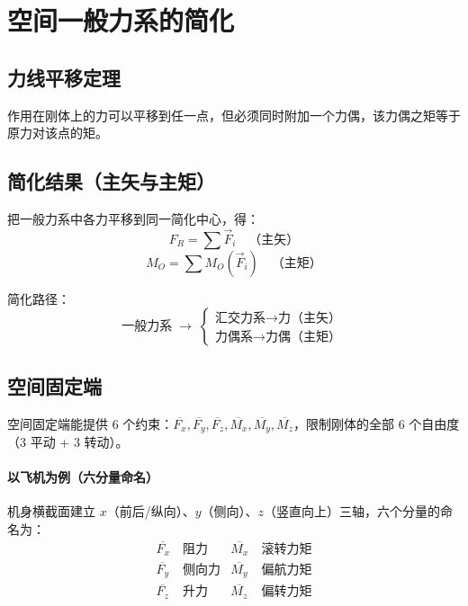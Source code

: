 \section{空间一般力系的简化}

\subsection{力线平移定理}

 作用在刚体上的力可以平移到任一点，但必须同时附加一个力偶，该力偶之矩等于原力对该点的矩。

\subsection{简化结果（主矢与主矩）}

把一般力系中各力平移到同一简化中心，得：
\begin{equation}
F_R=\sum\vec{F}_i \quad \text{（主矢）}
\label{eq:3-简化-主矢}
\end{equation}
\begin{equation}
M_O=\sum M_O(\vec{F}_i) \quad \text{（主矩）}
\label{eq:3-简化-主矩}
\end{equation}

简化路径：
\begin{equation}
\text{一般力系}\;\longrightarrow\;
\begin{cases}
\text{汇交力系}\longrightarrow\text{力（主矢）}\\
\text{力偶系}\longrightarrow\text{力偶（主矩）}
\end{cases}
\label{eq:3-简化-路径}
\end{equation}

\subsection{空间固定端}

空间固定端能提供 6 个约束：$\overline{F_x},\overline{F_y},\overline{F_z},\overline{M_x},\overline{M_y},\overline{M_z}$，限制刚体的全部 6 个自由度（3 平动 + 3 转动）。

\paragraph{以飞机为例（六分量命名）}
机身横截面建立 $x$（前后/纵向）、$y$（侧向）、$z$（竖直向上）三轴，六个分量的命名为：
\begin{align*}
\overline{F_x}&\ \text{阻力} & \overline{M_x}&\ \text{滚转力矩}\\
\overline{F_y}&\ \text{侧向力} & \overline{M_y}&\ \text{偏航力矩}\\
\overline{F_z}&\ \text{升力} & \overline{M_z}&\ \text{偏转力矩}
\end{align*}

